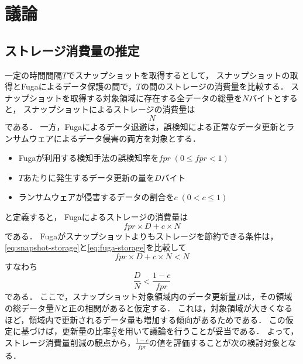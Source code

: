 \chapter{議論}
\label{chap:discussion}

\section{ストレージ消費量の推定}
一定の時間間隔$T$でスナップショットを取得するとして，
スナップショットの取得とFugaによるデータ保護の間で，$T$の間のストレージの消費量を比較する．
スナップショットを取得する対象領域に存在する全データの総量を$N$バイトとすると，
スナップショットによるストレージの消費量は
\begin{equation}
  \label{eq:snapshot-storage}
  N
\end{equation}
である．
一方，Fugaによるデータ退避は，誤検知による正常なデータ更新とランサムウェアによるデータ侵害の両方を対象とする．
\begin{itemize}
  \item Fugaが利用する検知手法の誤検知率を$fpr \;(0 \le fpr < 1)$
  \item $T$あたりに発生するデータ更新の量を$D$バイト
  \item ランサムウェアが侵害するデータの割合を$c \; (0 < c \le 1)$
\end{itemize}
と定義すると，
Fugaによるストレージの消費量は
\begin{equation}
  \label{eq:fuga-storage}
  fpr \times D + c \times N
\end{equation}
である．
Fugaがスナップショットよりもストレージを節約できる条件は，\eqref{eq:snapshot-storage}と\eqref{eq:fuga-storage}を比較して
\begin{equation}
  fpr \times D + c \times N < N
\end{equation}
すなわち
\begin{equation}
  \label{eq:storage-compare}
  \frac{D}{N} < \frac{1-c}{fpr}
\end{equation}
である．
ここで，スナップショット対象領域内のデータ更新量$D$は，その領域の総データ量$N$と正の相関があると仮定する．
これは，対象領域が大きくなるほど，領域内で更新されるデータ量も増加する傾向があるためである．
この仮定に基づけば，更新量の比率$\frac{D}{N}$を用いて議論を行うことが妥当である．
よって，ストレージ消費量削減の観点から，$\frac{1-c}{fpr}$の値を評価することが次の検討対象となる．

